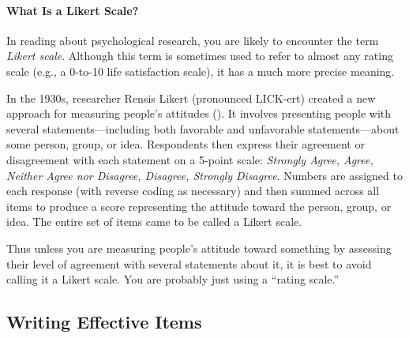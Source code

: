 \documentclass[
]{krantz}
\begin{document}
\paragraph*{What Is a Likert Scale?}\label{what-is-a-likert-scale}

In reading about psychological research, you are likely to encounter the term \emph{Likert scale}. Although this term is sometimes used to refer to almost any rating scale (e.g., a 0-to-10 life satisfaction scale), it has a much more precise meaning.

In the 1930s, researcher Rensis Likert (pronounced LICK-ert) created a new approach for measuring people's attitudes (). It involves presenting people with several statements---including both favorable and unfavorable statements---about some person, group, or idea. Respondents then express their agreement or disagreement with each statement on a 5-point scale: \emph{Strongly Agree, Agree, Neither Agree nor Disagree, Disagree, Strongly Disagree}. Numbers are assigned to each response (with reverse coding as necessary) and then summed across all items to produce a score representing the attitude toward the person, group, or idea. The entire set of items came to be called a Likert scale.

Thus unless you are measuring people's attitude toward something by assessing their level of agreement with several statements about it, it is best to avoid calling it a Likert scale. You are probably just using a ``rating scale.''

\subsection*{Writing Effective Items}\label{writing-effective-items}
\end{document}
